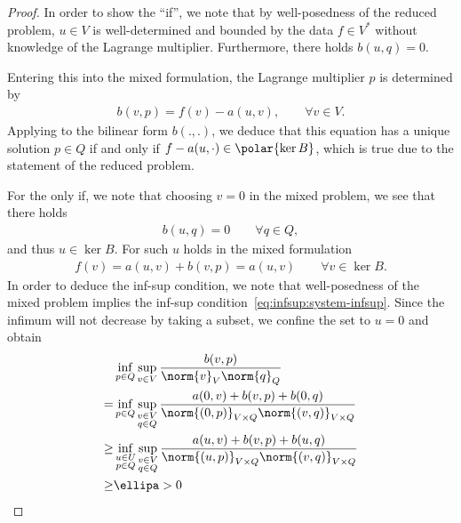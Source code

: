 \begin{proof}
  In order to show the ``if'', we note that by well-posedness of the
  reduced problem, $u\in V$ is well-determined and bounded by the data
  $f\in V^*$ without knowledge of the Lagrange
  multiplier. Furthermore, there holds $b(u,q) = 0$.
  
  Entering this into the mixed formulation, the Lagrange multiplier
  $p$ is determined by
  \begin{gather}
    b(v,p) = f(v) - a(u,v), \qquad\forall v\in V.
  \end{gather}
  Applying  to the
  bilinear form $b(.,.)$, we deduce that this equation has a unique
  solution $p\in Q$ if and only if $f-a(u,\cdot) \in \polar{\ker B}$, which
  is true due to the statement of the reduced problem.

  For the only if, we note that choosing $v=0$ in the mixed problem,
  we see that there holds
  \begin{gather}
    b(u,q) = 0 \qquad \forall q\in Q,
  \end{gather}
  and thus $u\in \ker B$. For such $u$ holds in the mixed formulation
  \begin{gather}
    f(v) = a(u,v) + b(v,p) = a(u,v) \qquad \forall v \in \ker B.
  \end{gather}
  In order to deduce the inf-sup condition, we note that
  well-posedness of the mixed problem implies the inf-sup
  condition~\eqref{eq:infsup:system-infsup}. Since the infimum will
  not decrease by taking a subset, we confine the set to $u=0$ and
  obtain
  \begin{align}
    &\inf_{p\in Q}\sup_{v\in V} \frac{b(v,p)}{\norm{v}_V\norm{q}_Q}
    \\ = &
           \inf_{p\in Q}
           \sup_{\substack{v\in V\\q\in Q}}
    \frac{a(0,v) + b(v,p) + b(0,q)}{\norm{(0,p)}_{V\times Q} \norm{(v,q)}_{V\times Q}}
    \\ \ge&
            \inf_{\substack{u\in U\\p\in Q}}
    \sup_{\substack{v\in V\\q\in Q}}
    \frac{a(u,v) + b(v,p) + b(u,q)}{\norm{(u,p)}_{V\times Q} \norm{(v,q)}_{V\times Q}} \\\ge& \ellipa > 0
  \end{align}
\end{proof}

